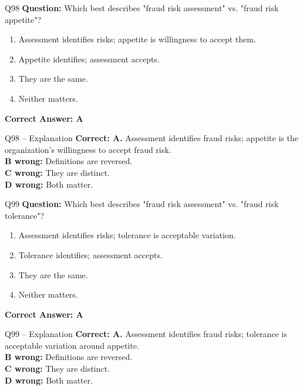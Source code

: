 \documentclass[aspectratio=169,10pt]{beamer}
\begin{document}
	\begin{frame}[t]{Q98}
		\small
		\textbf{Question:} Which best describes "fraud risk assessment" vs. "fraud risk appetite"?
		\begin{enumerate}[label=\Alph*.,itemsep=1pt,topsep=2pt]
			\item Assessment identifies risks; appetite is willingness to accept them.
			\item Appetite identifies; assessment accepts.
			\item They are the same.
			\item Neither matters.
		\end{enumerate}
		\vspace{4pt}
		\textbf{Correct Answer: A}
	\end{frame}
	
	\begin{frame}[t]{Q98 -- Explanation}
		\small
		\textbf{Correct: A.} Assessment identifies fraud risks; appetite is the organization's willingness to accept fraud risk. \\[4pt]
		\textbf{B wrong:} Definitions are reversed. \\[2pt]
		\textbf{C wrong:} They are distinct. \\[2pt]
		\textbf{D wrong:} Both matter.
	\end{frame}
	
	\begin{frame}[t]{Q99}
		\small
		\textbf{Question:} Which best describes "fraud risk assessment" vs. "fraud risk tolerance"?
		\begin{enumerate}[label=\Alph*.,itemsep=1pt,topsep=2pt]
			\item Assessment identifies risks; tolerance is acceptable variation.
			\item Tolerance identifies; assessment accepts.
			\item They are the same.
			\item Neither matters.
		\end{enumerate}
		\vspace{4pt}
		\textbf{Correct Answer: A}
	\end{frame}
	
	\begin{frame}[t]{Q99 -- Explanation}
		\small
		\textbf{Correct: A.} Assessment identifies fraud risks; tolerance is acceptable variation around appetite. \\[4pt]
		\textbf{B wrong:} Definitions are reversed. \\[2pt]
		\textbf{C wrong:} They are distinct. \\[2pt]
		\textbf{D wrong:} Both matter.
	\end{frame}
	
\end{document}
